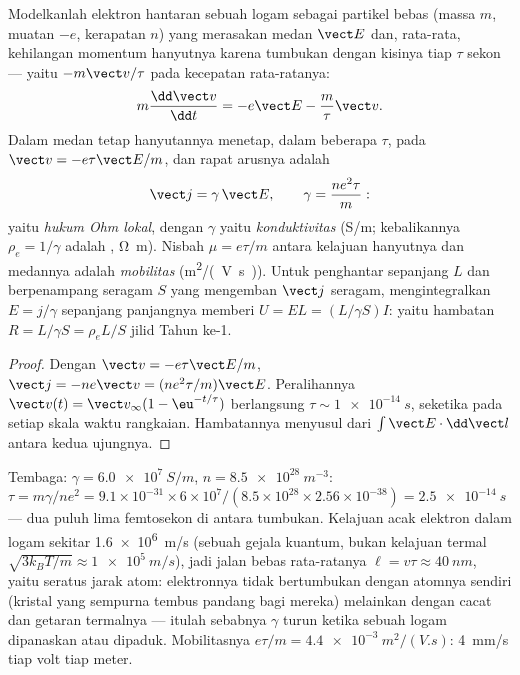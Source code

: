 \begin{proposition}\label{prop:b2:charges-currents-conduction:drude}
Modelkanlah elektron hantaran sebuah logam sebagai partikel bebas (massa $m$,
muatan $-e$, kerapatan $n$) yang merasakan medan $\vect E$ dan, rata-rata,
kehilangan momentum hanyutnya karena tumbukan dengan kisinya tiap $\tau$
sekon --- yaitu  $-m\vect v/\tau$ pada kecepatan rata-ratanya:
\[
m\frac{\dd\vect v}{\dd t} = -e\vect E - \frac m\tau\vect v .
\]
Dalam medan tetap hanyutannya menetap, dalam beberapa $\tau$, pada $\vect v = -e\tau
\vect E/m$, dan rapat arusnya adalah
\[
\vect j = \gamma\,\vect E , \qquad \gamma = \frac{ne^2\tau}{m} :
\]
yaitu \emph{hukum Ohm lokal}, dengan $\gamma$ yaitu \emph{konduktivitas}
(\unit{S/m}; kebalikannya $\rho_e = 1/\gamma$ adalah \emph{},
\unit{\ohm.m}). Nisbah $\mu = e\tau/m$ antara kelajuan hanyutnya dan medannya adalah
\emph{mobilitas} (\unit{m^2/(V.s)}). Untuk penghantar sepanjang $L$ dan
berpenampang seragam $S$ yang mengemban $\vect j$ seragam, mengintegralkan $E = j/\gamma$
sepanjang panjangnya memberi $U = EL = (L/\gamma S)I$: yaitu hambatan $R = L/\gamma S
= \rho_eL/S$ jilid Tahun ke-1.
\end{proposition}

\begin{proof}
Dengan $\vect v = -e\tau\vect E/m$, $\vect j = -ne\vect v = (ne^2\tau/m)\vect E$.
Peralihannya $\vect v(t) = \vect v_\infty(1 - \eu^{-t/\tau})$ berlangsung $\tau \sim
\qty{1e-14}{s}$, seketika pada setiap skala waktu rangkaian. Hambatannya
menyusul dari $\int\vect E\cdot\dd\vect l$ antara kedua ujungnya.
\end{proof}

\begin{example}\label{ex:b2:charges-currents-conduction:copper}
Tembaga: $\gamma = \qty{6.0e7}{S/m}$, $n = \qty{8.5e28}{m^{-3}}$: $\tau = m\gamma/ne^2 =
9.1 \times 10^{-31} \times 6 \times 10^7/(8.5 \times 10^{28} \times 2.56 \times 10^{-38}) = \qty{2.5e-14}{s}$
--- dua puluh lima femtosekon di antara tumbukan. Kelajuan acak
elektron dalam logam sekitar \qty{1.6e6}{m/s} (sebuah gejala kuantum, bukan
kelajuan termal $\sqrt{3k_BT/m} \approx \qty{1e5}{m/s}$), jadi jalan bebas rata-ratanya $\ell
= v\tau \approx \qty{40}{nm}$, yaitu seratus jarak atom: elektronnya tidak
bertumbukan dengan atomnya sendiri (kristal yang sempurna tembus pandang bagi
mereka) melainkan dengan cacat dan getaran termalnya --- itulah sebabnya
$\gamma$ turun ketika sebuah logam dipanaskan atau dipaduk. Mobilitasnya $e\tau/m =
\qty{4.4e-3}{m^2/(V.s)}$: \qty{4}{mm/s} tiap volt tiap meter.
\end{example}

